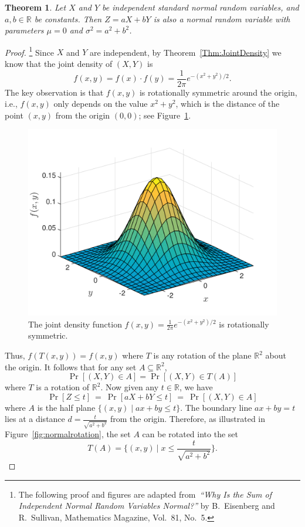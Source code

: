 \documentclass[11pt]{article}
\newcounter{thm}
\newtheorem{theorem}{Theorem}[thm]
\begin{document}
\begin{theorem}\label{thm:normalsum}
Let $X$ and $Y$ be independent standard normal random variables, and $a,b \in \mathbb{R}$ be constants. Then
$Z = aX + bY$ is also a normal random variable with parameters $\mu = 0$ and $\sigma^2 = a^2 + b^2$.
\end{theorem}
\begin{proof}\footnote{The following proof and figures are adapted from~{\em ``Why Is the Sum of Independent Normal Random Variables Normal?''} by B.~Eisenberg and R.~Sullivan, Mathematics Magazine, Vol.~81, No.~5.}
Since $X$ and $Y$ are independent, by Theorem~\ref{Thm:JointDensity} we know that the joint density of $(X,Y)$ is
$$f(x,y) = f(x) \cdot f(y) = \frac{1}{2\pi} e^{-(x^2+y^2)/2}.$$
The key observation is that $f(x,y)$ is rotationally symmetric around the origin, i.e., $f(x,y)$ only depends on the value $x^2 + y^2$,
which is the distance of the point $(x,y)$ from the origin $(0,0)$; see Figure~\ref{fig:jointnormal}.

\begin{figure}[h!]
\centering
\includegraphics[scale=0.4]{jointnormal}
\caption{The joint density function $f(x,y) = \frac{1}{2\pi} e^{-(x^2+y^2)/2}$ is rotationally symmetric.}
\label{fig:jointnormal}
\end{figure}

 Thus, $f(T(x,y)) = f(x,y)$ where $T$ is any rotation of the plane
$\mathbb{R}^2$ about the origin. It follows that for any set $A \subseteq \mathbb{R}^2$,
\begin{equation}\label{Eq:NormalRotation}
\Pr[(X,Y) \in A] = \Pr[(X,Y) \in T(A)]
\end{equation}
where $T$ is a rotation of $\mathbb{R}^2$. Now given any $t \in \mathbb{R}$, we have
$$\Pr[Z \le t] ~=~ \Pr[aX + bY \le t] ~=~ \Pr[(X,Y) \in A]$$
where $A$ is the half plane $\{(x,y) \mid ax + by \le t\}$. The boundary line $ax+by = t$ lies at a distance
$d = \frac{t}{\sqrt{a^2 + b^2}}$ from the origin. Therefore, as illustrated in Figure~\ref{fig:normalrotation}, the set $A$ can be rotated into the set
$$T(A) = \big\{(x,y) \: \big| \; x \le \frac{t}{\sqrt{a^2+b^2}} \big\}.$$


\end{proof}
\end{document}
